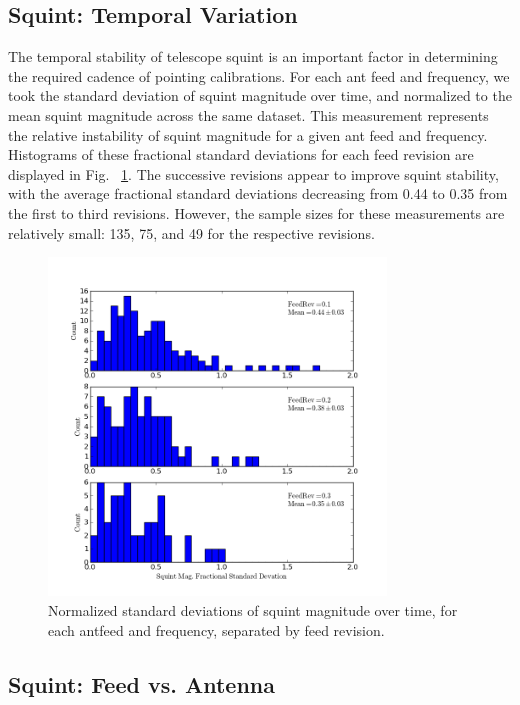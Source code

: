 \documentclass[preprint]{aastex}
\begin{document}
\subsection{Squint: Temporal Variation}\label{ss.temporal}
The temporal stability of telescope squint is an important factor in 
determining the required cadence of pointing calibrations.  For each ant 
feed and frequency, we took the standard deviation of squint magnitude 
over time, and normalized to the mean squint magnitude across the same 
dataset.  This measurement represents the relative instability of squint 
magnitude for a given ant feed and frequency.  Histograms of these 
fractional standard deviations for each feed revision are displayed in Fig.~
\ref{fig.squint_time}.  The successive revisions appear to improve squint 
stability, with the average fractional standard deviations decreasing from 
0.44 to 0.35 from the first to third revisions.  However, the sample sizes for 
these measurements are relatively small: 135, 75, and 49 for the respective 
revisions.  

\begin{figure}[htb]
\begin{center}
\includegraphics[width=0.8\textwidth]{images/squinttime_rev}
\caption{Normalized standard deviations of squint magnitude over time, for each antfeed and frequency, separated by feed revision. \label{fig.squint_time}}
\end{center}
\end{figure}

\subsection{Squint: Feed vs. Antenna}\label{ss.antfeed}
\end{document}
